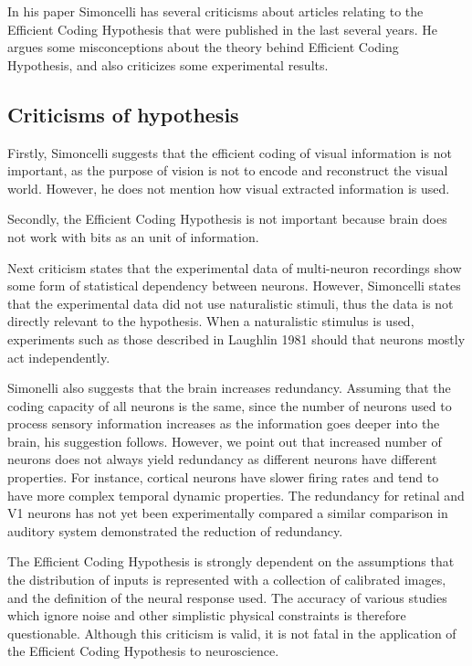 \documentclass[twoside]{article}
\begin{document}
\begin{multicols}{2}
In his paper Simoncelli has several criticisms about articles relating to the Efficient Coding Hypothesis that were published in the last several years. He argues some misconceptions about the theory behind Efficient Coding Hypothesis, and also criticizes some experimental results.

\subsection{Criticisms of hypothesis}

Firstly, Simoncelli suggests that the efficient coding of visual information is not important, as the purpose of vision is not to encode and reconstruct the visual world. However, he does not mention how visual extracted information is used. 

Secondly, the Efficient Coding Hypothesis is not important because brain does not work with bits as an unit of information. 

Next criticism states that the experimental data of multi-neuron recordings show some form of statistical dependency between neurons. However, Simoncelli states that the experimental data did not use naturalistic stimuli, thus the data is not directly relevant to the hypothesis. When a naturalistic stimulus is used, experiments such as those described in Laughlin 1981 should that neurons mostly act independently. 

Simonelli also suggests that the brain increases redundancy. Assuming that the coding capacity of all neurons is the same, since the number of neurons used to process sensory information increases as the information goes deeper into the brain, his suggestion follows. However, we point out that increased number of neurons does not always yield redundancy as different neurons have different properties. For instance, cortical neurons have slower firing rates and tend to have more complex temporal dynamic properties. The redundancy for retinal and V1 neurons has not yet been experimentally compared a similar comparison in auditory system demonstrated the reduction of redundancy. 

The Efficient Coding Hypothesis is strongly dependent on the assumptions that the distribution of inputs is represented with a collection of calibrated images, and the definition of the neural response used. The accuracy of various studies which ignore noise and other simplistic physical constraints is therefore questionable. Although this criticism is valid, it is not fatal in the application of the Efficient Coding Hypothesis to neuroscience. 


\end{multicols}
\end{document}
